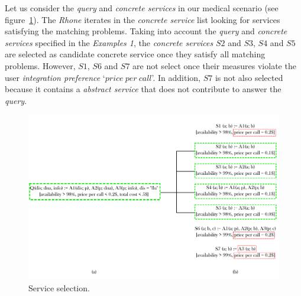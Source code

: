 Let us consider the \textit{query} and \textit{concrete services} in our medical scenario (see figure~\ref{fig:queryandservices-selecting}).
The \textit{Rhone} iterates in the \textit{concrete service} list looking for services satisfying the matching problems.
Taking into account the \textit{query} and \textit{concrete services} specified in the \textit{Examples 1}, the \textit{concrete services} $S2$ and $S3$, $S4$ and $S5$ are selected as candidate concrete service once they satisfy all matching problems. However, $S1$, $S6$ and $S7$ are not select once their measures violate the user \textit{integration preference} `$price \ per \ call$'. In addition, $S7$ is not also selected because it contains a \textit{abstract service} that does not contribute to answer the \textit{query}.
\begin{figure}[h!]
\center
\includegraphics[scale=0.57]{query-and-services-selecting.pdf}
\caption{Service selection.}\label{fig:queryandservices-selecting}
\end{figure}

%

